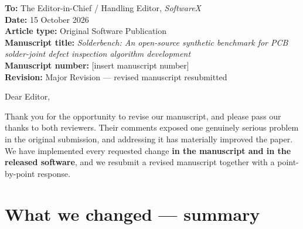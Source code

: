\documentclass[11pt]{article}
\begin{document}
\noindent
\textbf{To:} The Editor-in-Chief / Handling Editor, \textit{SoftwareX}\\[2pt]
\textbf{Date:} 15 October 2026\\[2pt]
\textbf{Article type:} Original Software Publication\\[2pt]
\textbf{Manuscript title:} \textit{Solderbench: An open-source synthetic benchmark for PCB solder-joint defect inspection algorithm development}\\[2pt]
\textbf{Manuscript number:} [insert manuscript number]\\[2pt]
\textbf{Revision:} Major Revision --- revised manuscript resubmitted

\vspace{8pt}
\noindent Dear Editor,

Thank you for the opportunity to revise our manuscript, and please pass our thanks to
both reviewers. Their comments exposed one genuinely serious problem in the original
submission, and addressing it has materially improved the paper. We have implemented
every requested change \textbf{in the manuscript and in the released software}, and we
resubmit a revised manuscript together with a point-by-point response.

\section*{What we changed --- summary}
\end{document}

